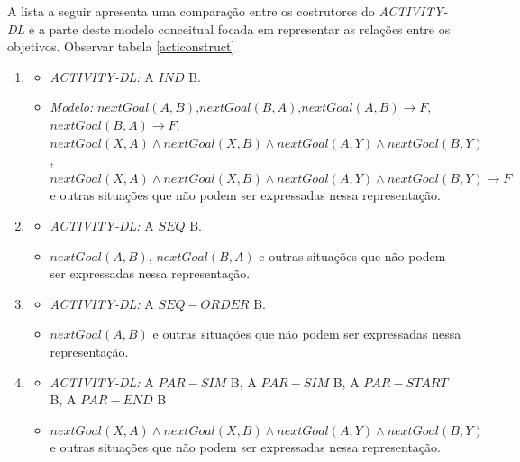 A lista a seguir apresenta uma comparação entre os costrutores do \textit{ACTIVITY-DL} e a parte deste modelo conceitual focada em representar as relações entre os objetivos. Observar tabela \ref{acticonstruct} 

\begin{enumerate}
	\item \begin{itemize}
			\item \textit{ACTIVITY-DL:}  A $IND$ B.
			\item \textit{Modelo:} $nextGoal(A,B)$,$nextGoal(B,A)$,$nextGoal(A,B) \to F$,$nextGoal(B,A) \to F$, $nextGoal(X,A) \wedge nextGoal(X,B) \wedge nextGoal(A,Y) \wedge nextGoal(B,Y)$, $nextGoal(X,A) \wedge nextGoal(X,B) \wedge nextGoal(A,Y) \wedge nextGoal(B,Y) \to F$   e outras situações que não podem ser expressadas nessa representação.
		\end{itemize}
	\item \begin{itemize}
			\item \textit{ACTIVITY-DL:} A $SEQ$ B.
			\item $nextGoal(A,B)$, $nextGoal(B,A)$ e outras situações que não podem ser expressadas nessa representação. 
		\end{itemize}
	\item \begin{itemize}
			\item \textit{ACTIVITY-DL:} A $SEQ-ORDER$ B.
			\item $nextGoal(A,B)$  e outras situações que não podem ser expressadas nessa representação.
		\end{itemize}
	\item \begin{itemize}
			\item \textit{ACTIVITY-DL:} A $PAR-SIM$ B, A $PAR-SIM$ B, A $PAR-START$ B, A $PAR-END$ B 
			\item $nextGoal(X,A) \wedge nextGoal(X,B) \wedge nextGoal(A,Y) \wedge nextGoal(B,Y) $ e outras situações que não podem ser expressadas nessa representação.  
		\end{itemize}
\end{enumerate} 